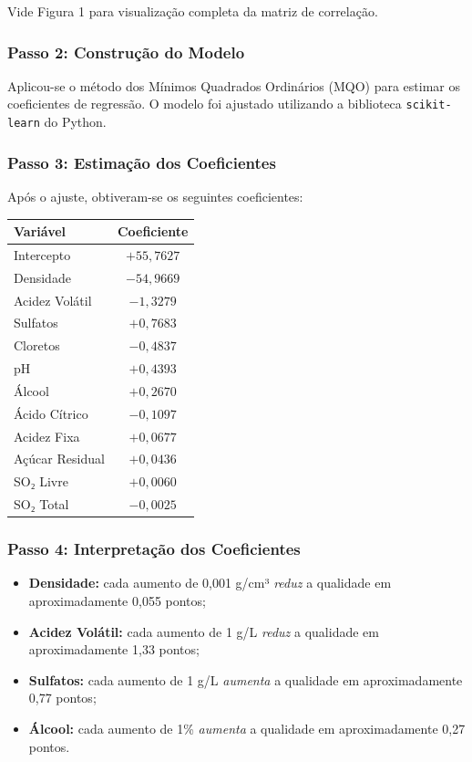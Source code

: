 \documentclass[12pt,a4paper]{article}
\begin{document}
Vide Figura 1 para visualização completa da matriz de correlação.

\subsubsection*{Passo 2: Construção do Modelo}

Aplicou-se o método dos Mínimos Quadrados Ordinários (MQO) para estimar os coeficientes de regressão. O modelo foi ajustado utilizando a biblioteca \texttt{scikit-learn} do Python.

\subsubsection*{Passo 3: Estimação dos Coeficientes}

Após o ajuste, obtiveram-se os seguintes coeficientes:

\begin{center}
\begin{tabular}{|l|c|}
\hline
\textbf{Variável} & \textbf{Coeficiente} \\
\hline
Intercepto & $+55,7627$ \\
Densidade & $-54,9669$ \\
Acidez Volátil & $-1,3279$ \\
Sulfatos & $+0,7683$ \\
Cloretos & $-0,4837$ \\
pH & $+0,4393$ \\
Álcool & $+0,2670$ \\
Ácido Cítrico & $-0,1097$ \\
Acidez Fixa & $+0,0677$ \\
Açúcar Residual & $+0,0436$ \\
SO₂ Livre & $+0,0060$ \\
SO₂ Total & $-0,0025$ \\
\hline
\end{tabular}
\end{center}

\subsubsection*{Passo 4: Interpretação dos Coeficientes}

\begin{itemize}
  \item \textbf{Densidade:} cada aumento de 0,001 g/cm³ \textit{reduz} a qualidade em aproximadamente 0,055 pontos;
  \item \textbf{Acidez Volátil:} cada aumento de 1 g/L \textit{reduz} a qualidade em aproximadamente 1,33 pontos;
  \item \textbf{Sulfatos:} cada aumento de 1 g/L \textit{aumenta} a qualidade em aproximadamente 0,77 pontos;
  \item \textbf{Álcool:} cada aumento de 1\% \textit{aumenta} a qualidade em aproximadamente 0,27 pontos.
\end{itemize}
\end{document}

